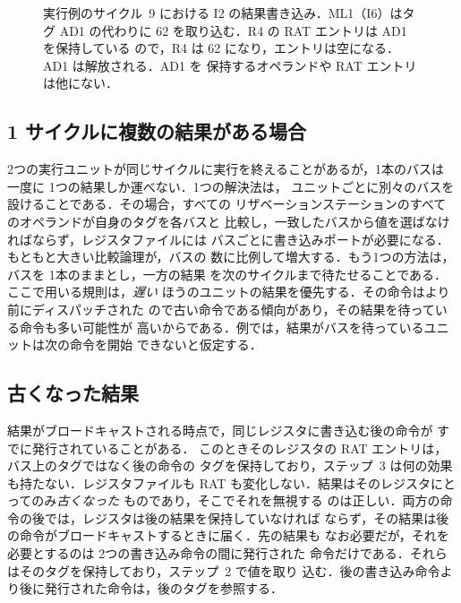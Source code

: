 \documentclass[../main.tex]{subfiles}
\begin{document}
\begin{figure}[htbp]
  \centering
  
  \caption{実行例のサイクル~9 における I2 の結果書き込み．ML1（I6）はタグ
    AD1 の代わりに 62 を取り込む．R4 の RAT エントリは AD1 を保持している
    ので，R4 は 62 になり，エントリは空になる．AD1 は解放される．AD1 を
    保持するオペランドや RAT エントリは他にない．}
  \label{fig:l07-broadcast}
\end{figure}

\subsection{1 サイクルに複数の結果がある場合}
\label{sec:l07-cdb-conflict}

2つの実行ユニットが同じサイクルに実行を終えることがあるが，1本のバスは
一度に 1つの結果しか運べない．1つの解決法は，
ユニットごとに別々のバスを設けることである．その場合，すべての
リザベーションステーションのすべてのオペランドが自身のタグを各バスと
比較し，一致したバスから値を選ばなければならず，レジスタファイルには
バスごとに書き込みポートが必要になる．もともと大きい比較論理が，バスの
数に比例して増大する．もう1つの方法は，バスを 1本のままとし，一方の結果
を次のサイクルまで待たせることである．ここで用いる規則は，\emph{遅い}
ほうのユニットの結果を優先する．その命令はより前にディスパッチされた
ので古い命令である傾向があり，その結果を待っている命令も多い可能性が
高いからである．例では，結果がバスを待っているユニットは次の命令を開始
できないと仮定する．

\subsection{古くなった結果}
\label{sec:l07-stale}

結果がブロードキャストされる時点で，同じレジスタに書き込む後の命令が
すでに発行されていることがある．
このときそのレジスタの RAT エントリは，バス上のタグではなく後の命令の
タグを保持しており，ステップ~3 は何の効果も持たない．レジスタファイルも
RAT も変化しない．結果はそのレジスタにとってのみ\emph{古くなった}%
ものであり，そこでそれを無視する
のは正しい．両方の命令の後では，レジスタは後の結果を保持していなければ
ならず，その結果は後の命令がブロードキャストするときに届く．先の結果も
なお必要だが，それを必要とするのは 2つの書き込み命令の間に発行された
命令だけである．それらはそのタグを保持しており，ステップ~2 で値を取り
込む．後の書き込み命令より後に発行された命令は，後のタグを参照する．
\end{document}
